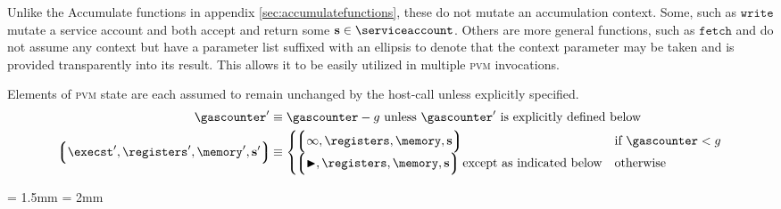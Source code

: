 Unlike the Accumulate functions in appendix \ref{sec:accumulatefunctions}, these do not mutate an accumulation context. Some, such as $\mathtt{write}$ mutate a service account and both accept and return some $\mathbf{s} \in \serviceaccount$. Others are more general functions, such as $\mathtt{fetch}$ and do not assume any context but have a parameter list suffixed with an ellipsis to denote that the context parameter may be taken and is provided transparently into its result. This allows it to be easily utilized in multiple \textsc{pvm} invocations.

Elements of \textsc{pvm} state are each assumed to remain unchanged by the host-call unless explicitly specified.
\begin{align}
  \gascounter' &\equiv \gascounter - g\text{ unless $\gascounter'$ is explicitly defined below}\\
  \tup{\execst', \registers', \memory', \mathbf{s}'} &\equiv \begin{cases}
    \tup{\oog, \registers, \memory, \mathbf{s}} &\when \gascounter < g\\
    \tup{\continue, \registers, \memory, \mathbf{s}} \text{ except as indicated below} &\otherwise
  \end{cases}
\end{align}

\aboverulesep = 1.5mm \belowrulesep = 2mm

